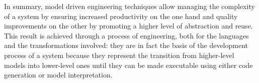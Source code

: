 In summary, model driven engineering techniques allow managing the complexity of a system by ensuring increased productivity on the one hand and quality improvements on the other by promoting a higher level of abstraction and reuse. This result is achieved through a process of engineering, both for the languages and the transformations involved: they are in fact the basis of the development process of a system because they represent the transition from higher-level models into lower-level ones until they can be made executable using either code generation or model interpretation.


